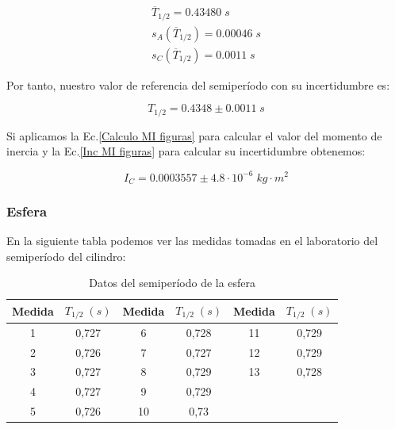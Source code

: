 \documentclass[a4paper,12pt,titlepage]{article}
\begin{document}
\begin{equation}
    \begin{gathered}
        \overline{T}_{1/2} = 0.43480 \; s \\
        s_A(\overline{T}_{1/2}) = 0.00046 \; s \\
        s_C(\overline{T}_{1/2}) = 0.0011 \; s
    \end{gathered}
\end{equation}

Por tanto, nuestro valor de referencia del semiperíodo con su incertidumbre es:

\begin{equation}
    T_{1/2} = 0.4348 \pm 0.0011 \; s
\end{equation}

Si aplicamos la Ec.\ref{Calculo MI figuras} para calcular el valor del momento de inercia y la Ec.\ref{Inc MI figuras} para calcular su incertidumbre obtenemos:

\begin{equation}
    I_C = 0.0003557 \pm 4.8 \cdot 10^{-6} \; kg\cdot m^2
\end{equation}

\subsubsection{Esfera}

En la siguiente tabla podemos ver las medidas tomadas en el laboratorio del semiperíodo del cilindro:

\begin{table}[h!]
    \centering
    \begin{tabular}{|c|c|c|c|cc}
    \hline
    Medida  &  $T_{1/2}\; (s)$ & Medida   & $T_{1/2}\; (s)$   & \multicolumn{1}{c|}{Medida}   & \multicolumn{1}{c|}{$T_{1/2}\; (s)$}      \\ \hline
    1 & 0,727 & 6  & 0,728 & \multicolumn{1}{c|}{11} & \multicolumn{1}{c|}{0,729} \\ \hline
    2 & 0,726 & 7  & 0,727 & \multicolumn{1}{c|}{12} & \multicolumn{1}{c|}{0,729} \\ \hline
    3 & 0,727 & 8  & 0,729 & \multicolumn{1}{c|}{13} & \multicolumn{1}{c|}{0,728} \\ \hline
    4 & 0,727 & 9  & 0,729 &                         &                            \\ \cline{1-4}
    5 & 0,726 & 10 & 0,73  &                         &                            \\ \cline{1-4}
    \end{tabular}
    \caption{Datos del semiperíodo de la esfera}
    \label{Datos semiT esfera}
\end{table}
\end{document}
